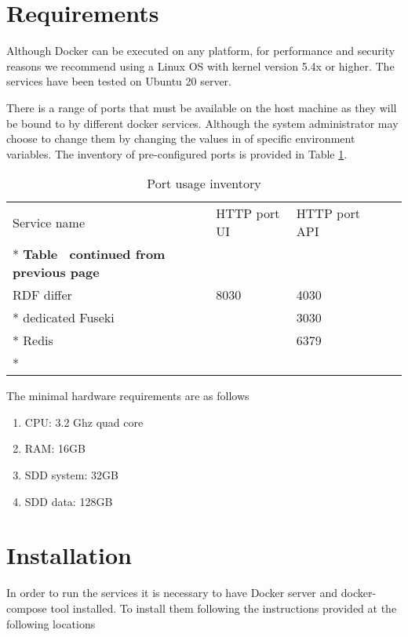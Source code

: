 \section{Requirements}
\label{sec:requirements}

Although Docker can be executed on any platform, for performance and security reasons we recommend using a Linux OS with kernel version 5.4x or higher. The services have been tested on Ubuntu 20 server. 

There is a range of ports that must be available on the host machine as they will be bound to by different docker services. Although the system administrator may choose to change them by changing the values in of specific environment variables. The inventory of pre-configured ports is provided in Table \ref{tab:port-inventory}.

\begin{longtable}[c]{@{}p{3.64cm}p{1.25cm}p{1.25cm}p{1.9cm}p{5cm}@{}}
	\toprule
	Service name     & HTTP port UI & HTTP port API             \\* \midrule
	\endfirsthead
	\multicolumn{5}{c}%
	{{\bfseries Table \thetable\ continued from previous page}} \\
	\endhead
	\bottomrule
	\endfoot
	\endlastfoot
	RDF differ       & 8030         & 4030                      \\* \hline
	dedicated Fuseki &              & 3030                      \\* \hline
	Redis            &              & 6379                      \\* \bottomrule
	\caption{Port usage inventory}
	\label{tab:port-inventory}                                  \\
\end{longtable}

The minimal hardware requirements are as follows 
\begin{enumerate}
	\item CPU: 3.2 Ghz quad core
	\item RAM: 16GB
	\item SDD system: 32GB
	\item SDD data: 128GB
\end{enumerate}

\section{Installation}
\label{sec:installation}

In order to run the services it is necessary to have Docker server and docker-compose tool installed. To install them following the instructions provided at the following locations

